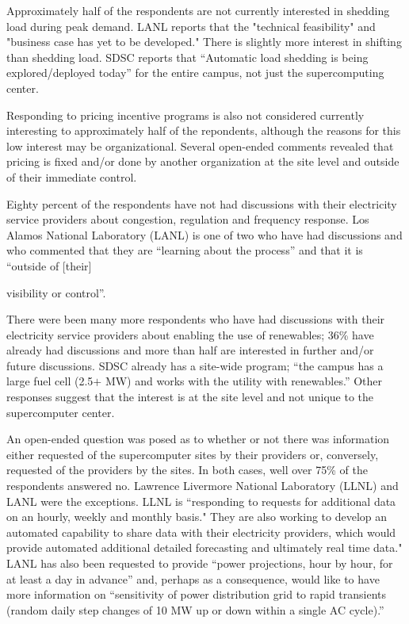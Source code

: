 Approximately half of the respondents are not currently interested in shedding
load during peak demand. LANL reports that the "technical feasibility" and "business case has yet to be developed."
There is slightly more interest in shifting than shedding load. SDSC reports that
 ``Automatic load shedding is being
explored/deployed today'' for the entire campus, not just the supercomputing center.

Responding to pricing incentive programs is also not considered currently interesting to approximately half of the repondents,
although the reasons for this low interest may be organizational. Several
open-ended comments revealed that pricing is fixed and/or done by another
organization at the site level and outside of their immediate control.

Eighty percent of the respondents have not had discussions with their
electricity service providers about congestion, regulation and frequency
response. Los Alamos National Laboratory (LANL) is one of two who have had discussions and who commented that
they are ``learning about the process'' and that it is ``outside of [their]

visibility or control''.

There were been many more respondents who have had discussions with their
electricity service providers about enabling the use of renewables; 36{\%}
have already had discussions and more than half are interested in further
and/or future discussions. SDSC already has a site-wide program; ``the
campus has a large fuel cell (2.5$+$ MW) and works with the utility with
renewables.'' Other responses suggest that the interest is at the site level
and not unique to the supercomputer center.

An open-ended question was posed as to whether or not there was information
either requested of the supercomputer sites by their providers or,
conversely, requested of the providers by the sites. In both cases, well
over 75{\%} of the respondents answered no. Lawrence Livermore National Laboratory (LLNL) and LANL were the
exceptions. LLNL is ``responding to requests for additional data on an hourly, 
weekly and monthly basis."  They are also working to develop an automated capability to share 
data with their electricity providers, which would provide automated additional 
detailed forecasting and ultimately real time data."
LANL has also been requested to provide ``power projections, hour by hour,
for at least a day in advance'' and, perhaps as a consequence, would like to
have more information on ``sensitivity of power distribution grid to rapid
transients (random daily step changes of 10 MW up or down within a single AC
cycle).''

